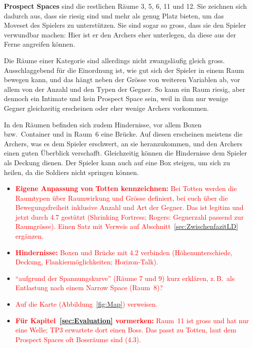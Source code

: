 \documentclass[../Main.tex]{subfiles}
\begin{document}
\textbf{Prospect Spaces} sind die restlichen Räume 3, 5, 6, 11 und 12. Sie zeichnen sich dadurch aus, dass sie riesig sind und mehr als genug Platz bieten, um das Moveset des Spielers zu unterstützen. Sie sind sogar so gross, dass sie den Spieler verwundbar machen: Hier ist er den Archers eher unterlegen, da diese aus der Ferne angreifen können.

Die Räume einer Kategorie sind allerdings nicht zwangsläufig gleich gross. Ausschlaggebend für die Einordnung ist, wie gut sich der Spieler in einem Raum bewegen kann, und das hängt neben der Grösse von weiteren Variablen ab, vor allem von der Anzahl und den Typen der Gegner. So kann ein Raum riesig, aber dennoch ein Intimate und kein Prospect Space sein, weil in ihm nur wenige Gegner gleichzeitig erscheinen oder eher wenige Archers vorkommen.

In den Räumen befinden sich zudem Hindernisse, vor allem Boxen bzw.\ Container und in Raum~6 eine Brücke. Auf diesen erscheinen meistens die Archers, was es dem Spieler erschwert, an sie heranzukommen, und den Archers einen guten Überblick verschafft. Gleichzeitig können die Hindernisse dem Spieler als Deckung dienen. Der Spieler kann auch auf eine Box steigen, um sich zu heilen, da die Soldiers nicht springen können.

\begin{itemize}[leftmargin=1.5cm]
    \item \textcolor{red}{\textbf{Eigene Anpassung von Totten kennzeichnen:} Bei Totten werden die Raumtypen über Raumwirkung und Grösse definiert, bei euch über die Bewegungsfreiheit inklusive Anzahl und Art der Gegner. Das ist legitim und jetzt durch 4.7 gestützt (Shrinking Fortress; Rogers: Gegnerzahl passend zur Raumgrösse). Einen Satz mit Verweis auf Abschnitt~\ref{sec:ZwischenfazitLD} ergänzen.}
    \item \textcolor{red}{\textbf{Hindernisse:} Boxen und Brücke mit 4.2 verbinden (Höhenunterschiede, Deckung, Flankiermöglichkeiten; Horizon-Talk).}
    \item \textcolor{red}{\enquote{aufgrund der Spannungskurve} (Räume 7 und 9) kurz erklären, z.\,B.\ als Entlastung nach einem Narrow Space (Raum~8)?}
    \item \textcolor{red}{Auf die Karte (Abbildung~\ref{fig:Map}) verweisen.}
    \item \textcolor{red}{\textbf{Für Kapitel~\ref{sec:Evaluation} vormerken:} Raum~11 ist gross und hat nur eine Welle; TP3 erwartete dort einen Boss. Das passt zu Totten, laut dem Prospect Spaces oft Bossräume sind (4.3).}
\end{itemize}
\end{document}
